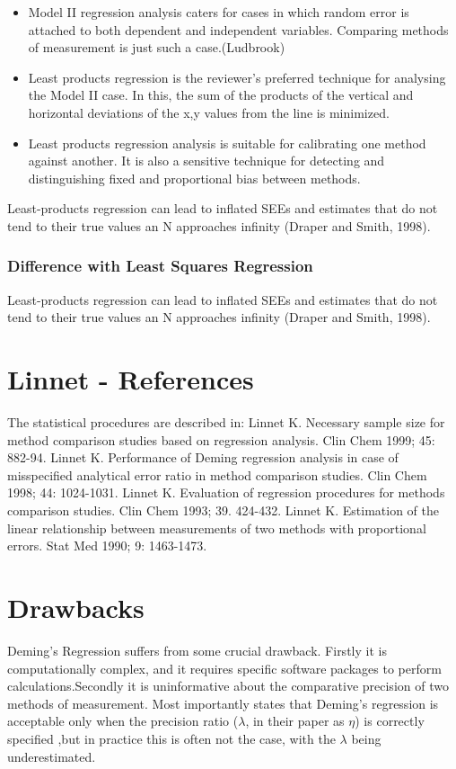 \documentclass[12pt, a4paper]{report}
\theoremstyle{plain}
\theoremstyle{definition}
\theoremstyle{remark}
\begin{document}
\begin{itemize}
	\item Model II regression analysis caters for cases in which random error is attached to both dependent and independent variables. Comparing methods of measurement is just such a case.(Ludbrook)
	
	\item Least products regression is the reviewer's preferred technique for analysing the Model II case. In this, the sum of the products of the vertical and horizontal deviations of the x,y values from the line is minimized.
	
	\item Least products regression analysis is suitable for calibrating one method against another. It is also a sensitive technique for detecting and distinguishing fixed and proportional bias between
	methods.
\end{itemize}

Least-products regression can lead to inflated SEEs and estimates that do not tend to their true values an N approaches infinity (Draper and Smith, 1998).

\subsubsection{Difference with Least Squares Regression}
Least-products regression can lead to inflated SEEs and estimates
that do not tend to their true values an N approaches infinity
(Draper and Smith, 1998).




\section{Linnet - References}
The statistical procedures are described in:
Linnet K. Necessary sample size for method comparison studies based on regression analysis. Clin Chem 1999; 45: 882-94.
Linnet K. Performance of Deming regression analysis in case of misspecified analytical error ratio in method comparison studies. Clin Chem 1998; 44: 1024-1031.
Linnet K. Evaluation of regression procedures for methods comparison studies. Clin Chem 1993; 39. 424-432.
Linnet K. Estimation of the linear relationship between measurements of two methods with proportional errors. Stat Med 1990; 9: 1463-1473.

\section{Drawbacks}
Deming's Regression suffers from some crucial drawback. Firstly it
is computationally complex, and it requires specific software
packages to perform calculations.Secondly it is uninformative
about the comparative precision of two methods of measurement.
Most importantly \citet{CarollRupert} states that Deming's
regression is acceptable only when the precision ratio ($\lambda$,
in their paper as $\eta$) is correctly specified ,but in practice
this is often not the case, with the $\lambda$ being
underestimated.	
\end{document}
